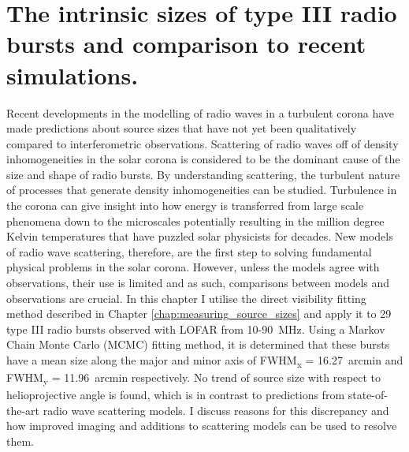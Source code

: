 \doublespacing
\chapter{The intrinsic sizes of type III radio bursts and comparison to recent simulations.}
\label{chap:observations_vs_theory}
Recent developments in the modelling of radio waves in a turbulent corona have made predictions about source sizes that have not yet been qualitatively compared to interferometric observations. Scattering of radio waves off of density inhomogeneities in the solar corona is considered to be the dominant cause of the size and shape of radio bursts. By understanding scattering, the turbulent nature of processes that generate density inhomogeneities can be studied. Turbulence in the corona can give insight into how energy is transferred from large scale phenomena down to the microscales potentially resulting in the million degree Kelvin temperatures that have puzzled solar physicists for decades. New models of radio wave scattering, therefore, are the first step to solving fundamental physical problems in the solar corona. However, unless the models agree with observations, their use is limited and as such, comparisons between models and observations are crucial. In this chapter I utilise the direct visibility fitting method described in Chapter \ref{chap:measuring_source_sizes} and apply it to 29 type III radio bursts observed with LOFAR from 10-90~MHz. Using a Markov Chain Monte Carlo (MCMC) fitting method, it is determined that these bursts have a mean size along the major and minor axis of FWHM\textsubscript{x} = 16.27~arcmin and FWHM\textsubscript{y} = 11.96~arcmin respectively. No trend of source size with respect to helioprojective angle is found, which is in contrast to predictions from state-of-the-art radio wave scattering models. I discuss reasons for this discrepancy and how improved imaging and additions to scattering models can be used to resolve them.

